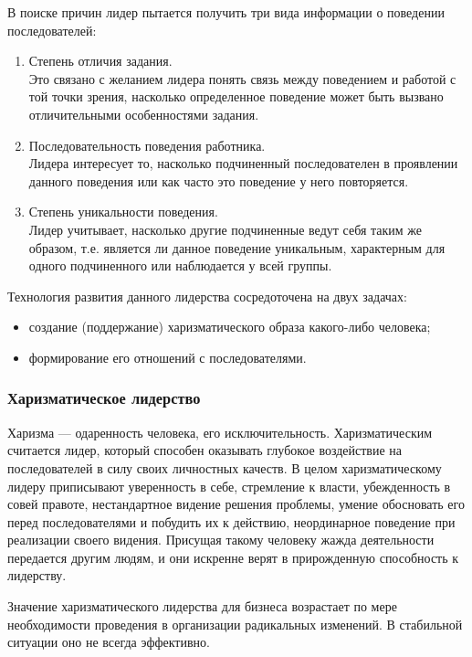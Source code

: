 \documentclass[a4paper,12pt,oneside,final]{extarticle}
\numberwithin{equation}{section}
\begin{document}
\begin{enumerate}
В поиске причин лидер пытается получить три вида информации о поведении последователей:
\begin{enumerate}
	\item Степень отличия задания. \\
	Это связано с желанием лидера понять связь между поведением и работой с той точки зрения, насколько определенное поведение может быть вызвано отличительными особенностями задания. 
	\item Последовательность поведения работника. \\ 
	Лидера интересует то, насколько подчиненный последователен в проявлении данного поведения или как часто это поведение у него повторяется.
	\item Степень уникальности поведения. \\
	Лидер учитывает, насколько другие подчиненные ведут себя таким же образом, т.е. является ли данное поведение уникальным, характерным для одного подчиненного или наблюдается у всей группы. 
\end{enumerate}

Технология развития данного лидерства сосредоточена на двух задачах:
\begin{itemize}
	\item создание (поддержание) харизматического образа какого-либо человека;
	\item формирование его отношений с последователями. 
\end{itemize}

\subsubsection{Харизматическое лидерство}
Харизма --- одаренность человека, его исключительность. 
Харизматическим считается лидер, который способен оказывать глубокое воздействие на последователей в силу своих личностных качеств. 
В целом харизматическому лидеру приписывают уверенность в себе, стремление к власти, убежденность в совей правоте, нестандартное видение решения проблемы, умение обосновать его перед последователями и побудить их к действию, неординарное поведение при реализации своего видения. 
Присущая такому человеку жажда деятельности передается другим людям, и они искренне верят в прирожденную способность к лидерству. 

Значение харизматического лидерства для бизнеса возрастает по мере необходимости проведения в организации радикальных изменений. 
В стабильной ситуации оно не всегда эффективно. 


\end{enumerate}
\end{document}
